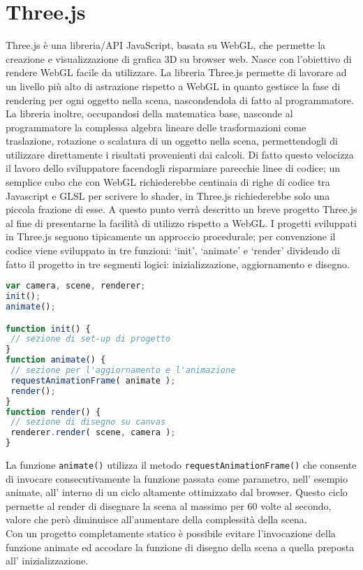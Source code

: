 \section{Three.js}
\label{sec:chapter_tecnologie_abilitanti_threejs}

Three.js è una libreria/API JavaScript, basata su WebGL, che permette la creazione e visualizzazione di grafica 3D su browser web. Nasce con l’obiettivo di rendere WebGL facile da utilizzare.
La libreria Three.js permette di lavorare ad un livello più alto di astrazione rispetto a WebGL in quanto gestisce la fase di rendering per ogni oggetto nella scena, nascondendola di fatto al programmatore.
La libreria inoltre, occupandosi della matematica base, nasconde al programmatore la complessa algebra lineare delle trasformazioni come traslazione, rotazione o scalatura di un oggetto nella scena, permettendogli di utilizzare direttamente i risultati provenienti dai calcoli.
Di fatto questo velocizza il lavoro dello sviluppatore facendogli risparmiare parecchie linee di codice; un semplice cubo che con WebGL richiederebbe centinaia di righe di codice tra Javascript e GLSL per scrivere lo shader, in Three.js richiederebbe solo una piccola frazione di esse.
A questo punto verrà descritto un breve progetto Three.js al fine di presentarne la facilità di utilizzo rispetto a WebGL.
I progetti sviluppati in Three.js seguono tipicamente un approccio procedurale; per convenzione il codice viene sviluppato in tre funzioni: ‘init’, ‘animate’ e ‘render’ dividendo di fatto il progetto in tre segmenti logici: inizializzazione, aggiornamento e disegno.
\begin{lstlisting}[language=javascript]
var camera, scene, renderer;
init();
animate();

function init() {
 // sezione di set-up di progetto
}
function animate() {
 // sezione per l'aggiornamento e l'animazione
 requestAnimationFrame( animate );
 render();
}
function render() {
 // sezione di disegno su canvas
 renderer.render( scene, camera );
}
\end{lstlisting}
La funzione \texttt{animate()} utilizza il metodo \texttt{requestAnimationFrame()} che consente di invocare consecutivamente la funzione passata come parametro, nell’ esempio animate, all’ interno di un ciclo altamente ottimizzato dal browser. Questo ciclo permette al render di disegnare la scena al massimo per 60 volte al secondo, valore che però diminuisce all’aumentare della complessità della scena.
\\
Con un progetto completamente statico è possibile evitare l’invocazione della funzione animate ed accodare la funzione di disegno della scena a quella preposta all’ inizializzazione.
